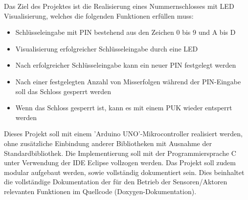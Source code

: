 Das Ziel des Projektes ist die Realisierung eines Nummernschlosses mit LED Visualisierung, welches die folgenden Funktionen erfüllen muss: 
\begin{itemize}
    \item Schlüsseleingabe mit PIN bestehend aus den Zeichen 0 bis 9 und A bis D
    \item Visualisierung erfolgreicher Schlüsseleingabe durch eine LED
    \item Nach erfolgreicher Schlüsseleingabe kann ein neuer PIN festgelegt werden
    \item Nach einer festgelegten Anzahl von Misserfolgen während der PIN-Eingabe soll das Schloss gesperrt werden
    \item Wenn das Schloss gesperrt ist, kann es mit einem PUK wieder entsperrt werden
\end{itemize}

Dieses Projekt soll mit einem 'Arduino UNO'-Mikrocontroller realisiert werden, ohne zusätzliche Einbindung anderer Bibliotheken mit Ausnahme der Standardbibliothek. Die Implementierung soll mit der Programmiersprache C unter Verwendung der IDE Eclipse vollzogen werden. Das Projekt soll zudem modular aufgebaut werden, sowie vollständig dokumentiert sein. Dies beinhaltet die vollständige Dokumentation der für den Betrieb der Sensoren/Aktoren relevanten Funktionen im Quellcode (Doxygen-Dokumentation). 